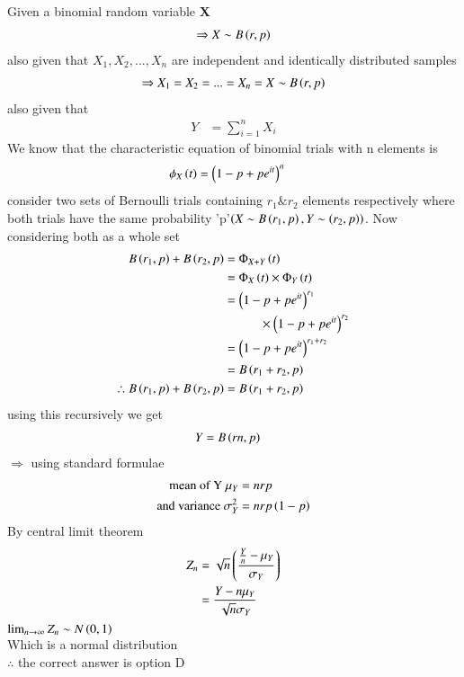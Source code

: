 Given a binomial random variable \textbf{X} 
\begin{align}
\Rightarrow X \sim B\left(r,p\right)
\end{align}
also given that $X_1,X_2,...,X_n$ are independent and identically distributed samples 
\begin{align}
    \Rightarrow X_1=X_2=...=X_n=X \sim B\left(r,p\right)
\end{align}
also given that
\begin{align}
Y&=\displaystyle\sum_{i=1}^n X_i
\end{align}
We know that the characteristic equation of binomial trials with n elements is \begin{align}
    \phi_X\left(t\right)&={\left(1-p+p e^{it}\right)}^n
\end{align}
consider two sets of Bernoulli trials containing $r_1 \& r_2$ elements respectively where both trials have the same probability 'p'$\left(X\sim B\left(r_1,p\right),Y\sim\left(r_2,p\right)\right)$. Now considering both as a whole set
\begin{align}
B\left(r_1,p\right)+B\left(r_2,p\right)&=\Phi_{X+Y}\left(t\right)\\
&=\Phi_X\left(t\right)\times \Phi_Y\left(t\right)\nonumber\\
&={\left(1-p+p e^{it}\right)}^{r_1}\nonumber\\
&\hspace*{1cm}\times {\ensuremath{\left(1-p+p e^{it}\right)}}^{r_2}\\
&={\left(1-p+p e^{it}\right)}^{r_1+r_2}\\
&=B\left(r_1+r_2,p\right)\nonumber\\
\therefore B\left(r_1,p\right)+B\left(r_2,p\right)&=B\left(r_1+r_2,p\right)
\end{align}
using this recursively we get
\begin{align}
    Y&=B\left(r n,p\right)
\end{align}
$\Rightarrow$ using standard formulae
\begin{align}
\text{mean of Y } \mu_Y&=nrp \nonumber\\
\text{and variance } \sigma^2_Y&=nrp\left(1-p\right)
\end{align}
By central limit theorem
\begin{align}
    Z_n &= \sqrt{n}\left(\frac{\frac{Y}{n} - \mu_Y}{\sigma_Y}\right)\nonumber\\
    &=\frac{Y-n \mu_Y}{\sqrt{n} \sigma_Y}
\end{align}
$\lim_{n \rightarrow \infty} Z_n \sim N\left(0,1\right)$ \\
Which is a normal distribution\\
$\therefore$ the correct answer is option D